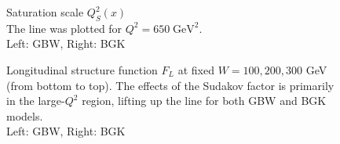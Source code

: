 \documentclass[11pt]{article}
\begin{document}

\begin{figure}[H]
\caption{Saturation scale $Q_S^2(x)$\\
The line was plotted for $Q^2=650\;\mathrm{ GeV^2}$.\\Left: GBW, Right: BGK }
\label{fig:critical}
\end{figure}


\begin{figure}[H]
\caption{Longitudinal structure function $F_L$ at fixed $W=100, 200, 300$ GeV (from bottom to top).
The effects of the Sudakov factor is primarily in the large-$Q^2$ region, lifting up the line for both GBW and BGK models.\\ 
Left: GBW, Right: BGK}
\end{figure}
\end{document}
